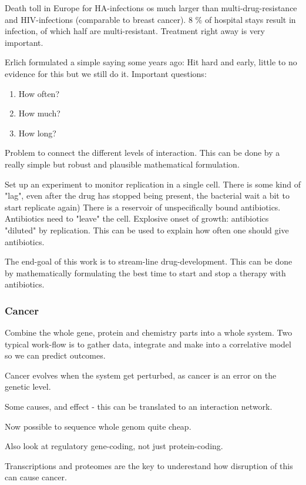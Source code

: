 \documentclass[12p]{article}
\begin{document}
Death toll in Europe for HA-infections os much larger than multi-drug-resistance and HIV-infections (comparable to breast cancer).
8 \% of hospital stays result in infection, of which half are multi-resistant.
Treatment right away is very important.

Erlich formulated a simple saying some years ago: Hit hard and early, little to no evidence for this but we still do it.
Important questions: 

\begin{enumerate}
    \item
	How often?
    \item
	How much?
    \item
	How long?
\end{enumerate}

Problem to connect the different levels of interaction.
This can be done by a really simple but robust and plausible mathematical formulation.

Set up an experiment to monitor replication in a single cell.
There is some kind of "lag", even after the drug has stopped being present, the bacterial wait a bit to start replicate again)
There is a reservoir of unspecifically bound antibiotics.
Antibiotics need to "leave" the cell.
Explosive onset of growth: antibiotics "diluted" by replication.
This can be used to explain how often one should give antibiotics.

The end-goal of this work is to stream-line drug-development.
This can be done by mathematically formulating the best time to start and stop a therapy with antibiotics.


\subsubsection{Cancer}

Combine the whole gene, protein and chemistry parts into a whole system.
Two typical work-flow is to gather data, integrate and make into a correlative model so we can predict outcomes.

Cancer evolves when the system get perturbed, as cancer is an error on the genetic level.

Some causes, and effect - this can be translated to an interaction network.

Now possible to sequence whole genom quite cheap.

Also look at regulatory gene-coding, not just protein-coding.

Transcriptions and proteomes are the key to underestand how disruption of this can cause cancer.
\end{document}
